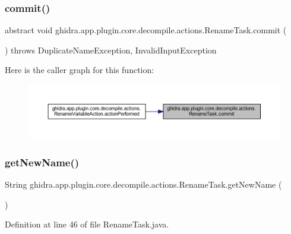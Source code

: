 \subsubsection{\texorpdfstring{commit()}{commit()}}
{\footnotesize\ttfamily abstract void ghidra.\+app.\+plugin.\+core.\+decompile.\+actions.\+Rename\+Task.\+commit (\begin{DoxyParamCaption}{ }\end{DoxyParamCaption}) throws Duplicate\+Name\+Exception, Invalid\+Input\+Exception\hspace{0.3cm}{\ttfamily [abstract]}}

Here is the caller graph for this function\+:
\nopagebreak
\begin{figure}[H]
\begin{center}
\leavevmode
\includegraphics[width=350pt]{classghidra_1_1app_1_1plugin_1_1core_1_1decompile_1_1actions_1_1_rename_task_a99f91949abe47258c840d2c025e845c3_icgraph}
\end{center}
\end{figure}
\mbox{\label{classghidra_1_1app_1_1plugin_1_1core_1_1decompile_1_1actions_1_1_rename_task_a01e2302182950a0bac21cd8409aaab64}} 
\subsubsection{\texorpdfstring{getNewName()}{getNewName()}}
{\footnotesize\ttfamily String ghidra.\+app.\+plugin.\+core.\+decompile.\+actions.\+Rename\+Task.\+get\+New\+Name (\begin{DoxyParamCaption}{ }\end{DoxyParamCaption})\hspace{0.3cm}{\ttfamily [inline]}}



Definition at line 46 of file Rename\+Task.\+java.

